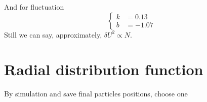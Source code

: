 \documentclass[UTF8,a4paper]{article}
\begin{document}
And for fluctuation
\begin{equation}
	\left\{
		\begin{aligned}
			k &= 0.13\\
			b &= -1.07
		\end{aligned}
	\right.
\end{equation}
Still we can say, approximately, $\delta U^2\propto N$.

\section{Radial distribution function}
By simulation and save final particles positions, choose one 
\end{document}
